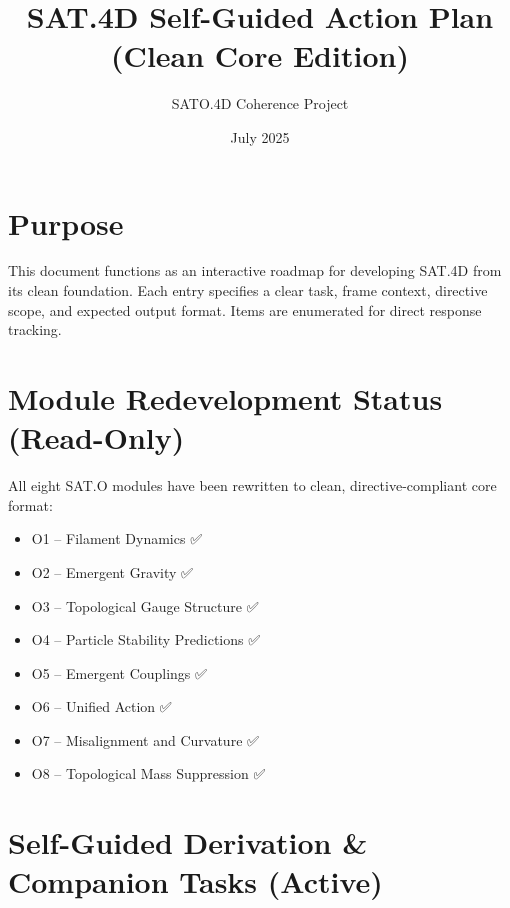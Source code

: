 \documentclass[12pt]{article}
\title{SAT.4D Self-Guided Action Plan (Clean Core Edition)}
\author{SATO.4D Coherence Project}
\date{July 2025}
\begin{document}
\maketitle

\section*{Purpose}

This document functions as an interactive roadmap for developing SAT.4D from its clean foundation. Each entry specifies a clear task, frame context, directive scope, and expected output format. Items are enumerated for direct response tracking.

\section*{Module Redevelopment Status (Read-Only)}

All eight SAT.O modules have been rewritten to clean, directive-compliant core format:
\begin{itemize}
    \item O1 – Filament Dynamics ✅
    \item O2 – Emergent Gravity ✅
    \item O3 – Topological Gauge Structure ✅
    \item O4 – Particle Stability Predictions ✅
    \item O5 – Emergent Couplings ✅
    \item O6 – Unified Action ✅
    \item O7 – Misalignment and Curvature ✅
    \item O8 – Topological Mass Suppression ✅
\end{itemize}

\section*{Self-Guided Derivation & Companion Tasks (Active)}
\end{document}
